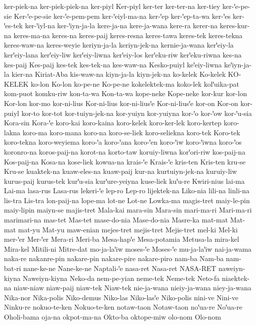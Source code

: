 {ker-piek-na
ker-piek-piek-na
ker-piyl
Ker-piyl
ker-ter
ker-ter-na
ker-tiey
ker-ꞌe-pe-sie
Ker-ꞌe-pe-sie
ker-ꞌe-pem-pem
ker-ꞌeiyl-ma-na
ker-ꞌep
ker-ꞌep-ta-wa
ker-ꞌes
ker-ꞌes-tek
ker-ꞌiyl-na
ker-ꞌiyn-ja-la
kere-ja-na
kere-ja-wana
kere-ra
kerer-na
keres-kur-na
keres-ma-na
keres-na
keres-paij
keres-resna
keres-tawa
keres-tek
keres-tekna
keres-waw-na
keres-weyie
keriyn-ja-la
keriyn-jek-na
kernie-ja-wana
kerꞌeiy-la
kerꞌeiy-lana
kerꞌeiy-liw
kerꞌeiy-liwna
kerꞌeiy-los
kerꞌeku-riw
kerꞌeku-riwna
kes-na
kes-paij
Kes-paij
kes-tek
kes-tek-na
kes-waw-na
Kesko-puiyl
keꞌeiy-liwna
keꞌiyn-ja-la
kier-na
Kiriat-Aba
kis-waw-na
kiyn-ja-la
kiyn-jek-na
ko-kelek
Ko-kelek
KO-KELEK
ko-lon
Ko-lon
ko-pe-ne
Ko-pe-ne
kokelektek-ma
koko-lek
kolꞌuika-pat
kom-puot
komku-riw
kon-ta-wa
Kon-ta-wa
kope-neke
Kope-neke
kor-kur
kor-lon
Kor-lon
kor-mo
kor-ni-lius
Kor-ni-lius
kor-ni-liusꞌe
Kor-ni-liusꞌe
kor-on
Kor-on
kor-puiyl
kor-to
kor-tot
kor-tuiyn-jek-na
kor-yuiyn
kor-yuiyna
kor-ꞌo
kor-ꞌow
kor-ꞌu-sia
Kora-sin
Kora-ꞌe
koro-kai
koro-kaina
koro-kelek
koro-ker-lek
koro-kertep
koro-lakna
koro-ma
koro-mana
koro-na
koro-se-liek
koro-seliekna
koro-tek
Koro-tek
koro-tekna
koro-weyiema
koro-ꞌa
koro-ꞌana
koro-ꞌen
koro-ꞌiw
koro-ꞌiwna
koro-ꞌos
koronro-na
koros-paij-na
korot-na
korto-taw
koruiy-liwna
korꞌori-riw
kos-paij-na
Kos-paij-na
Kosa-na
kose-liek
kowua-na
krais-ꞌe
Krais-ꞌe
kris-ten
Kris-ten
kru-se
Kru-se
kuaktek-na
kuaw-eles-na
kuaw-paij
kur-na
kurtuiyn-jek-na
kuruiy-liw
kurus-paij
kurus-tek
kurꞌu-sia
kurꞌure-yeiyna
kuse-liek
kuꞌu-re
Kwiri-nius
lai-ma
Lai-ma
lasa-rus
Lasa-rus
lekeri-ꞌe
lep-ro
Lep-ro
lijektek-na
Liko-nia
lili-na
linli-na
lis-tra
Lis-tra
lon-paij-na
lope-ma
lot-ne
Lot-ne
Lowka-ma
magis-tret
maiy-le-pin
maiy-lipin
maiyn-se
majis-tret
Mala-kai
mara-sin
Mara-sin
mari-ma-ri
Mari-ma-ri
marimari-na
mas-tet
Mas-tet
mase-do-nia
Mase-do-nia
Masre-ka
mat-mat
Mat-mat
mat-yu
Mat-yu
maw-enian
mejes-tret
mejis-tret
Mejis-tret
mel-ki
Mel-ki
mer-ꞌer
Mer-ꞌer
Mera-ri
Meri-ba
Mesa-hapꞌe
Mesa-potamia
Metusa-la
mira-kel
Mira-kel
Mitili-ni
Mitre-dat
mo-ja-laꞌiw
moses-ꞌe
Moses-ꞌe
mu-ja-laꞌiw
nai-ja-wama
naka-re
nakanre-pin
nakare-pin
nakare-pire
nakare-piro
nam-ba
Nam-ba
nam-bat-ri
nane-ke-ne
Nane-ke-ne
Naptali-ꞌe
nasa-ret
Nasa-ret
NASA-RET
naweiyn-kiyna
Naweiyn-kiyna
Neko-da
nem-pe-yian
neme-tek
Neme-tek
Neto-fa
niaektek-na
niaw-niaw
niaw-paij
niaw-tek
Niaw-tek
nie-ja-wana
nieiy-ja-wana
niey-ja-wana
Nika-nor
Nika-polis
Niko-demus
Niko-las
Niko-lasꞌe
Niko-polis
nini-ve
Nini-ve
Ninku-re
nokuo-te-ken
Nokuo-te-ken
notaw-taon
Notaw-taon
noꞌua-re
Noꞌua-re
Oholi-bama
oja-na
okpot-ma-na
Okto-ba
oktope-miw
olo-nom
Olo-nom
}
